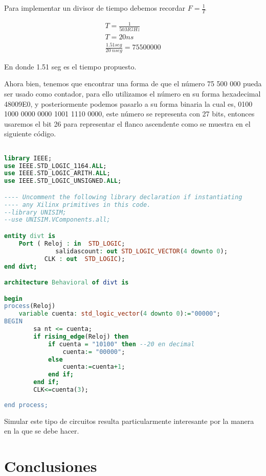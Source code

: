 \documentclass{mylib/reporteConCalif}
\begin{document}
Para implementar un divisor de tiempo debemos recordar $F = \frac{1}{T}$

\begin{gather*}
T = \frac{1}{50 MGHz}\\
T = 20 ns \\
\frac{1.51 seg}{20 \;n seg} = 75 500 000
\end{gather*}

En donde 1.51 seg es el tiempo propuesto. 

Ahora bien, tenemos que encontrar una forma de que el número 75 500 000 pueda ser usado como contador, para ello utilizamos el número en su forma hexadecimal 48009E0, y posteriormente podemos pasarlo a su forma binaria la cual es, 0100 1000 0000 0000 1001 1110 0000, este número se representa con 27 bits, entonces usaremos el bit 26 para representar el flanco ascendente como se muestra en el siguiente código.


\begin{lstlisting}[language=VHDL]

library IEEE;
use IEEE.STD_LOGIC_1164.ALL;
use IEEE.STD_LOGIC_ARITH.ALL;
use IEEE.STD_LOGIC_UNSIGNED.ALL;

---- Uncomment the following library declaration if instantiating
---- any Xilinx primitives in this code.
--library UNISIM;
--use UNISIM.VComponents.all;

entity divt is
    Port ( Reloj : in  STD_LOGIC;
			  salidascount: out STD_LOGIC_VECTOR(4 downto 0);
           CLK : out  STD_LOGIC);
end divt;

architecture Behavioral of divt is

begin
process(Reloj)
	variable cuenta: std_logic_vector(4 downto 0):="00000";
BEGIN
		sa nt <= cuenta;
		if rising_edge(Reloj) then
			if cuenta = "10100" then --20 en decimal
				cuenta:= "00000";
			else
				cuenta:=cuenta+1;
			end if;
		end if;	
		CLK<=cuenta(3);
		
end process;

\end{lstlisting}

Simular este tipo de circuitos resulta particularmente interesante por la manera en la que se debe hacer.


\section{Conclusiones}
\end{document}
